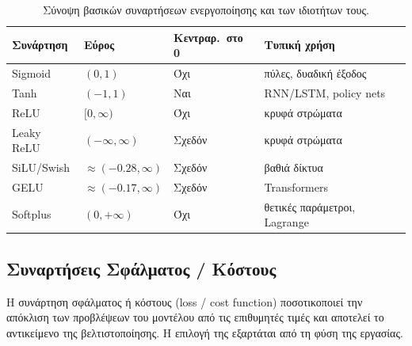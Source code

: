 \begin{table}[ht]
    \centering
    \caption{Σύνοψη βασικών συναρτήσεων ενεργοποίησης και των ιδιοτήτων τους.}
    \label{tab:activations}
    \begin{tabular}{@{}llll@{}}
        \toprule
        \textbf{Συνάρτηση} & \textbf{Εύρος} & \textbf{Κεντραρ.\ στο 0} &
        \textbf{Τυπική χρήση} \\
        \midrule
        Sigmoid & $(0,1)$ & Όχι & πύλες, δυαδική έξοδος \\
        Tanh & $(-1,1)$ & Ναι & RNN/LSTM, policy nets \\
        ReLU & $[0,\infty)$ & Όχι & κρυφά στρώματα \\
        Leaky ReLU & $(-\infty,\infty)$ & Σχεδόν & κρυφά στρώματα \\
        SiLU/Swish & $\approx(-0.28,\infty)$ & Σχεδόν & βαθιά δίκτυα \\
        GELU & $\approx(-0.17,\infty)$ & Σχεδόν & Transformers \\
        Softplus & $(0,+\infty)$ & Όχι & θετικές παράμετροι, Lagrange \\
        \bottomrule
    \end{tabular}
\end{table}


\subsection{Συναρτήσεις Σφάλματος / Κόστους}
\label{subsec:loss}

Η συνάρτηση σφάλματος ή κόστους (loss / cost
function) ποσοτικοποιεί την απόκλιση των προβλέψεων του μοντέλου από τις
επιθυμητές τιμές και αποτελεί το αντικείμενο της βελτιστοποίησης. Η επιλογή
της εξαρτάται από τη φύση της εργασίας.

